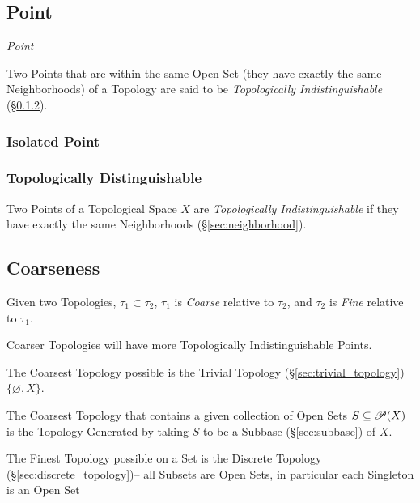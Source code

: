 \subsection{Point}\label{sec:topological_point}

\emph{Point}

Two Points that are within the same Open Set (they have exactly the
same Neighborhoods) of a Topology are said to be \emph{Topologically
  Indistinguishable} (\S\ref{sec:topologically_distinguishable}).



\subsubsection{Isolated Point}\label{sec:isolated_point}

\subsubsection{Topologically Distinguishable}
\label{sec:topologically_distinguishable}

Two Points of a Topological Space $X$ are \emph{Topologically
  Indistinguishable} if they have exactly the same Neighborhoods
(\S\ref{sec:neighborhood}).



\subsection{Coarseness}\label{sec:coarseness}

Given two Topologies, $\tau_1 \subset \tau_2$, $\tau_1$ is
\emph{Coarse} relative to $\tau_2$, and $\tau_2$ is \emph{Fine}
relative to $\tau_1$.

Coarser Topologies will have more Topologically Indistinguishable
Points.

The Coarsest Topology possible is the Trivial Topology
(\S\ref{sec:trivial_topology}) $\{ \varnothing, X \}$.

The Coarsest Topology that contains a given collection of Open Sets $S
\subseteq \mathscr{P}(X)$ is the Topology Generated by taking $S$ to
be a Subbase (\S\ref{sec:subbase}) of $X$.

The Finest Topology possible on a Set is the Discrete Topology
(\S\ref{sec:discrete_topology})-- all Subsets are Open Sets, in particular each
Singleton is an Open Set



